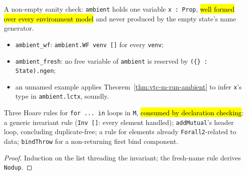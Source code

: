 \begin{example}
  \label{ex:ambient-context}
  \leanok

   A non-empty sanity check: \texttt{ambient} holds one variable
  \texttt{x : Prop}, \hl{well formed over every environment model} and never produced by the
  empty state's name generator.
  \begin{itemize}
  \item \texttt{ambient\_wf}: \texttt{ambient.WF venv []} for every \texttt{venv};
  \item \texttt{ambient\_fresh}: no free variable of \texttt{ambient} is reserved by
    \texttt{(\{\} : State).ngen};
  \item an unnamed example applies Theorem~\ref{thm:vtc-m-run-ambient} to infer \texttt{x}'s type
    in \texttt{ambient.lctx}, soundly.
  \end{itemize}
\end{example}

\begin{lemma}
  \label{thm:vtc-forin}
  \leanok

   Three Hoare rules for \texttt{for ... in} loops in \texttt{M}, \hl{consumed by
  declaration checking}: a generic invariant rule (\texttt{Inv []}: every element handled);
  \texttt{addMutual}'s header loop, concluding duplicate-free; a rule for elements already
  \texttt{Forall2}-related to data; \texttt{bindThrow} for a non-returning first bind component.
\end{lemma}
\begin{proof}
  \leanok
   Induction on the list threading the invariant; the fresh-name rule derives
  \texttt{Nodup}.
\end{proof}

